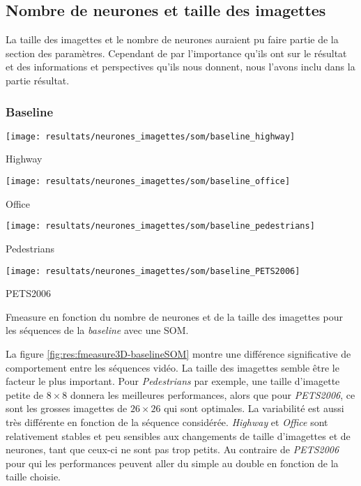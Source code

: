 	\subsection{Nombre de neurones et taille des imagettes}

	La taille des imagettes et le nombre de neurones auraient pu faire partie de la section des paramètres. Cependant de par l'importance qu'ils ont sur le résultat et des informations et perspectives qu'ils nous donnent, nous l'avons inclu dans la partie résultat.

	\subsubsection{Baseline}

	\begin{figureth}
		\begin{subfigureth}{.49\textwidth}
			\texttt{[image: resultats/neurones\_imagettes/som/baseline\_highway]}\caption{Highway}
		\end{subfigureth}
		\begin{subfigureth}{.49\textwidth}
			\texttt{[image: resultats/neurones\_imagettes/som/baseline\_office]}\caption{Office}
		\end{subfigureth}
		\begin{subfigureth}{.49\textwidth}
			\texttt{[image: resultats/neurones\_imagettes/som/baseline\_pedestrians]}\caption{Pedestrians}
		\end{subfigureth}
		\begin{subfigureth}{.49\textwidth}
			\texttt{[image: resultats/neurones\_imagettes/som/baseline\_PETS2006]}\caption{PETS2006}
		\end{subfigureth}
		\caption[Fmeasure en fonction du nombre de neurones et de la taille des imagettes, SOM baseline]{Fmeasure en fonction du nombre de neurones et de la taille des imagettes pour les séquences de la \textit{baseline} avec une SOM.}\label{fig:res:fmeasure3D-baselineSOM}
	\end{figureth}

	La figure \ref{fig:res:fmeasure3D-baselineSOM} montre une différence significative de comportement entre les séquences vidéo. La taille des imagettes semble être le facteur le plus important. Pour \textit{Pedestrians} par exemple, une taille d'imagette petite de $8\times8$ donnera les meilleures performances, alors que pour \textit{PETS2006}, ce sont les grosses imagettes de $26\times26$ qui sont optimales. La variabilité est aussi très différente en fonction de la séquence considérée. \textit{Highway} et \textit{Office} sont relativement stables et peu sensibles aux changements de taille d'imagettes et de neurones, tant que ceux-ci ne sont pas trop petits. Au contraire de \textit{PETS2006} pour qui les performances peuvent aller du simple au double en fonction de la taille choisie.

